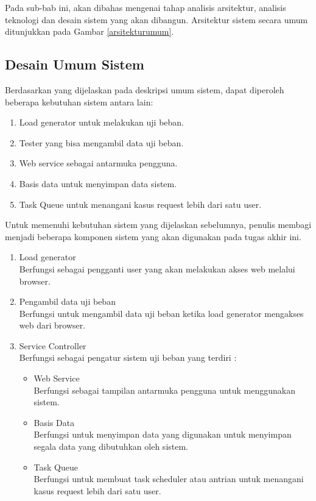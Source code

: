     	\indent Pada sub-bab ini, akan dibahas mengenai tahap analisis arsitektur, analisis teknologi dan desain sistem yang akan dibangun. Arsitektur sistem secara umum ditunjukkan pada Gambar \ref{arsitekturumum}.

    	\subsection{Desain Umum Sistem}
    		Berdasarkan yang dijelaskan pada deskripsi umum sistem, dapat diperoleh beberapa kebutuhan sistem antara lain:
    		\begin{enumerate}
    			\item Load generator untuk melakukan uji beban.
    			\item Tester yang bisa mengambil data uji beban.
    			\item Web service sebagai antarmuka pengguna.
    			\item Basis data untuk menyimpan data sistem.
    			\item Task Queue untuk menangani kasus request lebih dari satu user.
    		\end{enumerate}
    	
    		Untuk memenuhi kebutuhan sistem yang dijelaskan sebelumnya, penulis membagi menjadi beberapa komponen sistem yang akan digunakan pada tugas akhir ini.
    		
    		\begin{enumerate}
    			\item Load generator \\
    				Berfungsi sebagai pengganti user yang akan melakukan akses web melalui browser.
    			\item Pengambil data uji beban \\
    				Berfungsi untuk mengambil data uji beban ketika load generator mengakses web dari browser.
    			\item Service Controller \\
    				Berfungsi sebagai pengatur sistem uji beban yang terdiri :
    				\begin{itemize}
    					\item Web Service \\
    						Berfungsi sebagai tampilan antarmuka pengguna untuk menggunakan sistem.
    					\item Basis Data \\
    						Berfungsi untuk menyimpan data yang digunakan untuk menyimpan segala data yang dibutuhkan oleh sistem.
    					\item Task Queue \\
    						Berfungsi untuk membuat task scheduler atau antrian untuk menangani kasus request lebih dari satu user.
    				\end{itemize}
    		\end{enumerate}
    	
